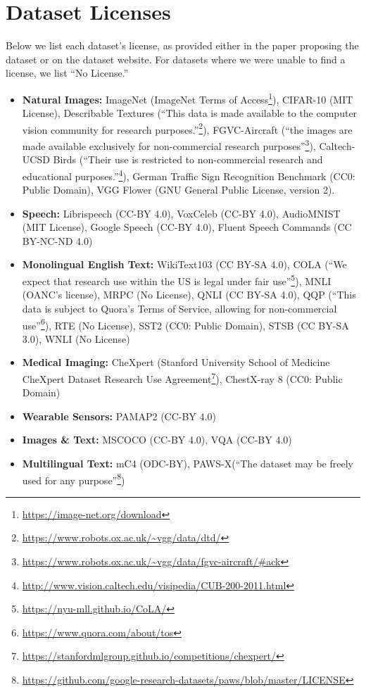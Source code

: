 \documentclass{article}
\begin{document}
\section{Dataset Licenses}
\label{appendix:licenses}
Below we list each dataset's license, as provided either in the paper proposing the dataset or on the dataset website. For datasets where we were unable to find a license, we list ``No License.''
\begin{itemize}
    \item \textbf{Natural Images:} ImageNet (ImageNet Terms of Access\footnote{\url{https://image-net.org/download}}), CIFAR-10 (MIT License), Describable Textures (``This data is made available to the computer vision community for research purposes.''\footnote{\url{https://www.robots.ox.ac.uk/~vgg/data/dtd/}}), FGVC-Aircraft (``the images are made available exclusively for non-commercial research purposes''\footnote{\url{https://www.robots.ox.ac.uk/~vgg/data/fgvc-aircraft/\#ack}}), Caltech-UCSD Birds (``Their use is restricted to non-commercial research and educational purposes.''\footnote{\url{http://www.vision.caltech.edu/visipedia/CUB-200-2011.html}}), German Traffic Sign Recognition Benchmark (CC0: Public Domain), VGG Flower (GNU General Public License, version 2).
    \item \textbf{Speech:} Librispeech (CC-BY 4.0), VoxCeleb (CC-BY 4.0), AudioMNIST (MIT License), Google Speech (CC-BY 4.0), Fluent Speech Commands (CC BY-NC-ND 4.0) 
    \item \textbf{Monolingual English Text:} WikiText103 (CC BY-SA 4.0), COLA (``We expect that research use within the US is legal under fair use''\footnote{\url{https://nyu-mll.github.io/CoLA/}}), MNLI (OANC's license), MRPC (No License), QNLI (CC BY-SA 4.0), QQP (``This data is subject to Quora's Terms of Service, allowing for non-commercial use''\footnote{\url{https://www.quora.com/about/tos}}), RTE (No License), SST2 (CC0: Public Domain), STSB (CC BY-SA 3.0), WNLI (No License)
    \item \textbf{Medical Imaging:} CheXpert (Stanford University School of Medicine CheXpert Dataset Research Use Agreement\footnote{\url{https://stanfordmlgroup.github.io/competitions/chexpert/}}),  ChestX-ray 8 (CC0: Public Domain)
    \item \textbf{Wearable Sensors:} PAMAP2 (CC-BY 4.0)
    \item \textbf{Images \& Text:} MSCOCO (CC-BY 4.0), VQA (CC-BY 4.0)
    \item \textbf{Multilingual Text:} mC4 (ODC-BY), PAWS-X(``The dataset may be freely used for any purpose''\footnote{\url{https://github.com/google-research-datasets/paws/blob/master/LICENSE}})
\end{itemize}
\end{document}
